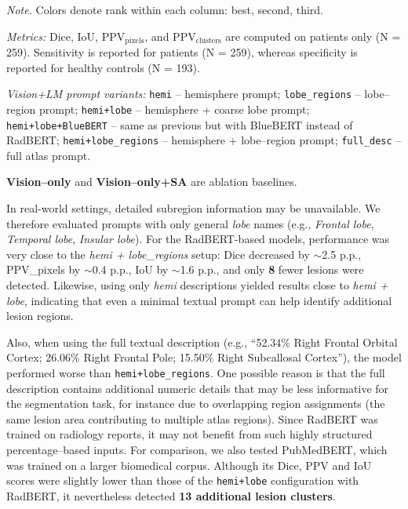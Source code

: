 \documentclass[FCD_GNN.tex]{subfiles}
\begin{document}
\begin{table}[ht]
\begin{threeparttable}
    \begin{tablenotes}[flushleft]
    \footnotesize
    \item \textit{Note.} Colors denote rank within each column:
    \colorbox{green!15}{best}, \colorbox{cyan!15}{second}, \colorbox{orange!15}{third}.
    \item \textit{Metrics: } Dice, IoU, PPV$_{\text{pixels}}$, and PPV$_{\text{clusters}}$ are computed on patients only (N = 259). 
    Sensitivity is reported for patients (N = 259), whereas specificity is reported for healthy controls (N = 193).
    \item \textit{Vision+LM prompt variants:}
    \texttt{hemi} -- hemisphere prompt;
    \texttt{lobe\_regions} -- lobe--region prompt;
    \texttt{hemi+lobe} -- hemisphere + coarse lobe prompt;
    \texttt{hemi+lobe+BlueBERT} -- same as previous but with BlueBERT instead of RadBERT; 
    \texttt{hemi+lobe\_regions} -- hemisphere + lobe--region prompt;
    \texttt{full\_desc} -- full atlas prompt.
    \item \textbf{Vision--only} and \textbf{Vision--only+SA} are ablation baselines.
    \end{tablenotes}
    
    \end{threeparttable}
    
\end{table}

In real-world settings, detailed subregion information may be unavailable. 
We therefore evaluated prompts with only general \textit{lobe} names (e.g., \textit{Frontal lobe}, \textit{Temporal lobe}, \textit{Insular lobe}). 
For the RadBERT-based models, performance was very close to the \textit{hemi + lobe\_regions} setup: Dice decreased by $\sim$2.5 \ac{p.p.}, PPV\_{pixels} by $\sim$0.4 \ac{p.p.}, IoU by $\sim$1.6 \ac{p.p.}, and only \textbf{8} fewer lesions were detected. 
Likewise, using only \textit{hemi} descriptions yielded results close to \textit{hemi + lobe}, indicating that even a minimal textual prompt can help identify additional lesion regions.

Also, when using the full textual description (e.g., ``52.34\% Right Frontal Orbital Cortex; 26.06\% Right Frontal Pole; 15.50\% Right Subcallosal Cortex''), the model performed worse than \texttt{hemi+lobe\_regions}.
One possible reason is that the full description contains additional numeric details that may be less informative for the segmentation task, for instance due to overlapping region assignments (the same lesion area contributing to multiple atlas regions).
Since RadBERT was trained on radiology reports, it may not benefit from such highly structured percentage--based inputs.
For comparison, we also tested PubMedBERT, which was trained on a larger biomedical corpus.
Although its Dice, PPV and IoU scores were slightly lower than those of the \texttt{hemi+lobe} configuration with RadBERT, it nevertheless detected \textbf{13 additional lesion clusters}.
\end{document}
